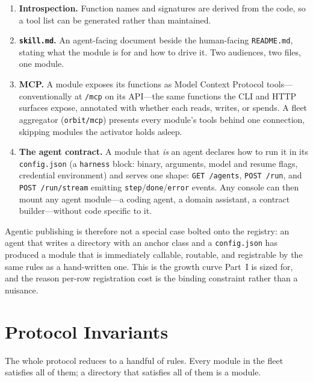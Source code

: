 \documentclass[11pt,a4paper]{article}
\begin{document}
\begin{enumerate}
    \item \textbf{Introspection.} Function names and signatures are derived from
    the code, so a tool list can be generated rather than maintained.
    \item \textbf{\texttt{skill.md}.} An agent-facing document beside the
    human-facing \texttt{README.md}, stating what the module is for and how to
    drive it. Two audiences, two files, one module.
    \item \textbf{MCP.} A module exposes its functions as Model Context Protocol
    tools---conventionally at \texttt{/mcp} on its API---the same functions the
    CLI and HTTP surfaces expose, annotated with whether each reads, writes, or
    spends. A fleet aggregator (\texttt{orbit/mcp}) presents every module's
    tools behind one connection, skipping modules the activator holds asleep.
    \item \textbf{The agent contract.} A module that \emph{is} an agent declares
    how to run it in its \texttt{config.json} (a \texttt{harness} block: binary,
    arguments, model and resume flags, credential environment) and serves one
    shape: \texttt{GET /agents}, \texttt{POST /run}, and \texttt{POST
    /run/stream} emitting \texttt{step}/\texttt{done}/\texttt{error} events.
    Any console can then mount any agent module---a coding agent, a domain
    assistant, a contract builder---without code specific to it.
\end{enumerate}

Agentic publishing is therefore not a special case bolted onto the registry: an
agent that writes a directory with an anchor class and a \texttt{config.json}
has produced a module that is immediately callable, routable, and registrable by
the same rules as a hand-written one. This is the growth curve Part~I is sized
for, and the reason per-row registration cost is the binding constraint rather
than a nuisance.

\section{Protocol Invariants}

The whole protocol reduces to a handful of rules. Every module in the fleet
satisfies all of them; a directory that satisfies all of them is a module.
\end{document}
